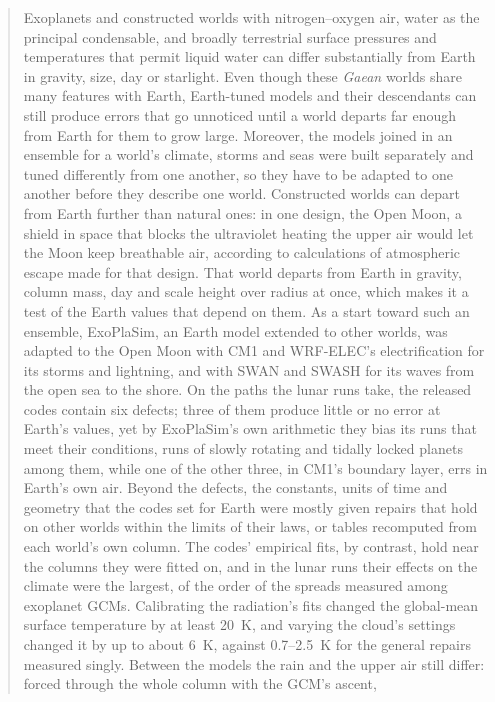 \begin{abstract}
\noindent Exoplanets and constructed worlds with nitrogen--oxygen air, water as the principal condensable, and
broadly terrestrial surface pressures and temperatures that permit liquid water can differ substantially from
Earth in gravity, size, day or starlight. Even though these \emph{Gaean} worlds share many features with Earth,
Earth-tuned models and their descendants can still produce errors that go unnoticed until a world departs far
enough from Earth for them to grow large. Moreover, the models joined in an ensemble for a world's climate,
storms and seas were built separately and tuned differently from one another, so they have to be adapted to one
another before they describe one world. Constructed worlds can depart from Earth further than natural ones: in
one design, the Open Moon, a shield in space that blocks the ultraviolet heating the upper air would let the Moon
keep breathable air, according to calculations of atmospheric escape made for that design. That world
departs from Earth in gravity, column mass, day and scale height over radius at once, which makes it a test of
the Earth values that depend on them. As a start toward such an ensemble, ExoPlaSim, an Earth model extended to
other worlds, was adapted to the Open Moon with CM1 and WRF-ELEC's electrification for its storms and lightning,
and with SWAN and SWASH for its waves from the open sea to the shore. On the paths the lunar runs take, the released codes contain six defects; three of them produce little or no
error at Earth's values, yet by ExoPlaSim's own arithmetic they bias its runs that meet their conditions, runs of
slowly rotating and tidally locked planets among them, while one of the other three, in CM1's boundary layer, errs in
Earth's own air.
Beyond the defects, the constants, units of time and geometry that the codes set for Earth were mostly given repairs
that hold on other worlds within the limits of their laws, or tables recomputed from each world's own column. The
codes' empirical fits, by contrast, hold near the columns they were fitted on, and in the lunar runs their effects on the climate were the largest, of the order of the spreads measured among exoplanet GCMs. Calibrating the radiation's
fits changed the global-mean surface temperature by at least 20~K, and varying the cloud's settings changed it by
up to about 6~K, against 0.7--2.5~K for the general repairs measured singly.
Between the models the rain and the upper air still differ: forced through the whole column with the GCM's ascent,

\end{abstract}
